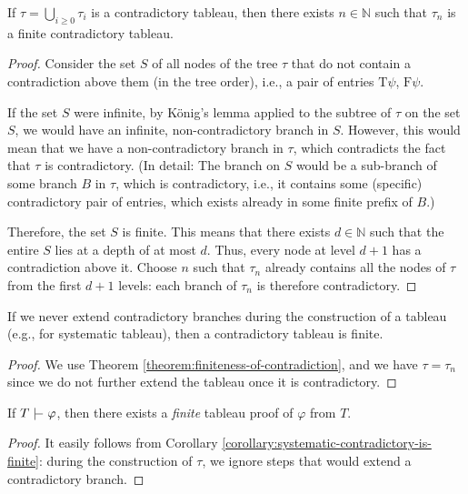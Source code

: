 \begin{theorem}\label{theorem:finiteness-of-contradiction}
    If $\tau = \bigcup_{i \geq 0} \tau_i$ is a contradictory tableau, then there exists $n \in \mathbb{N}$ such that $\tau_n$ is a finite contradictory tableau.
\end{theorem}
\begin{proof}
    Consider the set $S$ of all nodes of the tree $\tau$ that do not contain a contradiction above them (in the tree order), i.e., a pair of entries $\mathrm{T}\psi$, $\mathrm{F}\psi$.

    If the set $S$ were infinite, by König's lemma applied to the subtree of $\tau$ on the set $S$, we would have an infinite, non-contradictory branch in $S$. However, this would mean that we have a non-contradictory branch in $\tau$, which contradicts the fact that $\tau$ is contradictory. (In detail: The branch on $S$ would be a sub-branch of some branch $B$ in $\tau$, which is contradictory, i.e., it contains some (specific) contradictory pair of entries, which exists already in some finite prefix of $B$.)

    Therefore, the set $S$ is finite. This means that there exists $d \in \mathbb{N}$ such that the entire $S$ lies at a depth of at most $d$. Thus, every node at level $d+1$ has a contradiction above it. Choose $n$ such that $\tau_n$ already contains all the nodes of $\tau$ from the first $d+1$ levels: each branch of $\tau_n$ is therefore contradictory.
\end{proof}

\begin{corollary}\label{corollary:systematic-contradictory-is-finite}
    If we never extend contradictory branches during the construction of a tableau (e.g., for systematic tableau), then a contradictory tableau is finite.
\end{corollary}
\begin{proof}
We use Theorem \ref{theorem:finiteness-of-contradiction}, and we have $\tau = \tau_n$ since we do not further extend the tableau once it is contradictory.    
\end{proof}

\begin{corollary}\label{corollary:finiteness-of-proofs}
    If $T \proves \varphi$, then there exists a \emph{finite} tableau proof of $\varphi$ from $T$.
\end{corollary}
\begin{proof}
It easily follows from Corollary \ref{corollary:systematic-contradictory-is-finite}: during the construction of $\tau$, we ignore steps that would extend a contradictory branch.
\end{proof}

